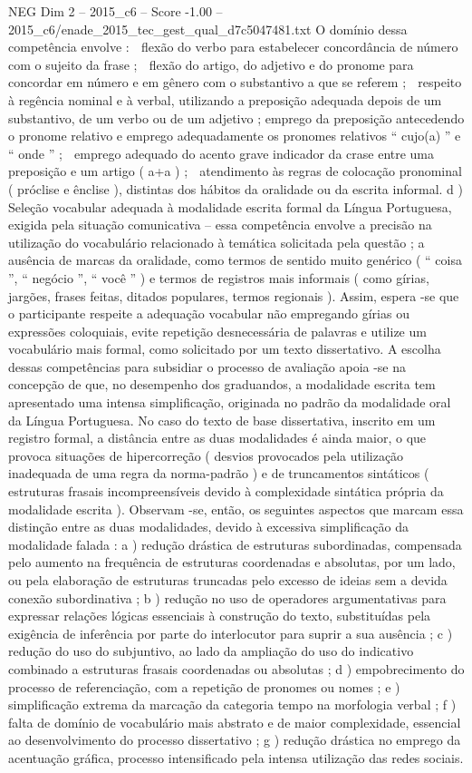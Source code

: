 \begin{textsample}{NEG Dim 2 – 2015\_c6 – Score -1.00 – 2015\_c6/enade\_2015\_tec\_gest\_qual\_d7c5047481.txt}
O domínio dessa competência envolve :  flexão do verbo para estabelecer concordância de número com o sujeito da frase ;  flexão do artigo, do adjetivo e do pronome para concordar em número e em gênero com o substantivo a que se referem ;  respeito à regência nominal e à verbal, utilizando a preposição adequada depois de um substantivo, de um verbo ou de um adjetivo ; emprego da preposição antecedendo o pronome relativo e emprego adequadamente os pronomes relativos “ cujo(a) ” e “ onde ” ;  emprego adequado do acento grave indicador da crase entre uma preposição e um artigo ( a+a ) ;  atendimento às regras de colocação pronominal ( próclise e ênclise ), distintas dos hábitos da oralidade ou da escrita informal. d ) Seleção vocabular adequada à modalidade escrita formal da Língua Portuguesa, exigida pela situação comunicativa – essa competência envolve a precisão na utilização do vocabulário relacionado à temática solicitada pela questão ; a ausência de marcas da oralidade, como termos de sentido muito genérico ( “ coisa ”, “ negócio ”, “ você ” ) e termos de registros mais informais ( como gírias, jargões, frases feitas, ditados populares, termos regionais ).
Assim, espera -se que o participante respeite a adequação vocabular não empregando gírias ou expressões coloquiais, evite repetição desnecessária de palavras e utilize um vocabulário mais formal, como solicitado por um texto dissertativo.
A escolha dessas competências para subsidiar o processo de avaliação apoia -se na concepção de que, no desempenho dos graduandos, a modalidade escrita tem apresentado uma intensa simplificação, originada no padrão da modalidade oral da Língua Portuguesa.
No caso do texto de base dissertativa, inscrito em um registro formal, a distância entre as duas modalidades é ainda maior, o que provoca situações de hipercorreção ( desvios provocados pela utilização inadequada de uma regra da norma-padrão ) e de truncamentos sintáticos ( estruturas frasais incompreensíveis devido à complexidade sintática própria da modalidade escrita ).
Observam -se, então, os seguintes aspectos que marcam essa distinção entre as duas modalidades, devido à excessiva simplificação da modalidade falada : a ) redução drástica de estruturas subordinadas, compensada pelo aumento na frequência de estruturas coordenadas e absolutas, por um lado, ou pela elaboração de estruturas truncadas pelo excesso de ideias sem a devida conexão subordinativa ; b ) redução no uso de operadores argumentativas para expressar relações lógicas essenciais à construção do texto, substituídas pela exigência de inferência por parte do interlocutor para suprir a sua ausência ; c ) redução do uso do subjuntivo, ao lado da ampliação do uso do indicativo combinado a estruturas frasais coordenadas ou absolutas ; d ) empobrecimento do processo de referenciação, com a repetição de pronomes ou nomes ; e ) simplificação extrema da marcação da categoria tempo na morfologia verbal ; f ) falta de domínio de vocabulário mais abstrato e de maior complexidade, essencial ao desenvolvimento do processo dissertativo ; g ) redução drástica no emprego da acentuação gráfica, processo intensificado pela intensa utilização das redes sociais.

\end{textsample}
